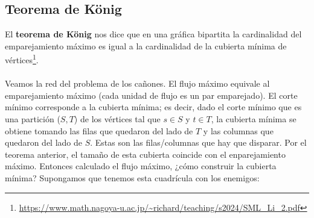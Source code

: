 \subsection{Teorema de König}
El \textbf{teorema de König} nos dice que en una gráfica bipartita la cardinalidad del emparejamiento máximo es igual a la cardinalidad de la cubierta mínima de vértices\footnote{\url{https://www.math.nagoya-u.ac.jp/~richard/teaching/s2024/SML_Li_2.pdf}}.
\\\\
Veamos la red del problema de los cañones. El flujo máximo equivale al emparejamiento
máximo (cada unidad de flujo es un par emparejado). El corte mínimo corresponde a la cubierta mínima; es decir, dado el corte mínimo que es una partición ($S,T$) de los vértices tal que $s\in S$ y $t \in T$, la cubierta mínima se obtiene tomando las filas que quedaron del lado de $T$ y las columnas que quedaron del lado de $S$. Estas son las filas/columnas que hay que disparar. Por el teorema anterior, el tamaño de esta cubierta coincide con el enparejamiento máximo. Entonces calculado el flujo máximo, ¿cómo construir la cubierta mínima?
Supongamos que tenemos esta cuadrícula con los enemigos:
\begin{figure}[H]
\centering
{}
\hspace{1.5cm}
\end{figure}

